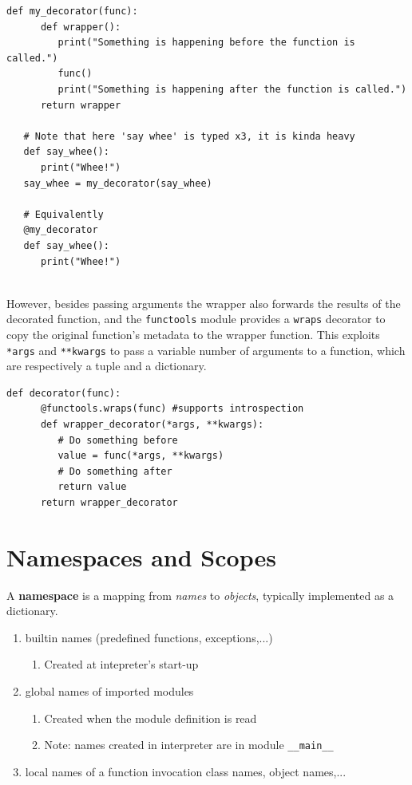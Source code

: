 \begin{lstlisting}[caption={``Pie'' syntax}]
   def my_decorator(func):
      def wrapper():
         print("Something is happening before the function is called.")
         func()
         print("Something is happening after the function is called.")
      return wrapper
   
   # Note that here 'say whee' is typed x3, it is kinda heavy
   def say_whee():
      print("Whee!")
   say_whee = my_decorator(say_whee)

   # Equivalently
   @my_decorator
   def say_whee():
      print("Whee!")
   
\end{lstlisting}

However, besides passing arguments the wrapper also forwards the results of the decorated function, and the \lstinline|functools| module provides a \lstinline|wraps| decorator to copy the original function's metadata to the wrapper function.
This exploits \lstinline|*args| and \lstinline|**kwargs| to pass a variable number of arguments to a function, which are respectively a tuple and a dictionary.

\begin{lstlisting}[caption={General decorator structure}]
   def decorator(func):
      @functools.wraps(func) #supports introspection
      def wrapper_decorator(*args, **kwargs):
         # Do something before
         value = func(*args, **kwargs)
         # Do something after
         return value
      return wrapper_decorator
\end{lstlisting}

\section{Namespaces and Scopes}
A \textbf{namespace} is a mapping from \textit{names} to \textit{objects}, typically
implemented as a dictionary.
\begin{enumerate}
   \item builtin names (predefined functions, exceptions,...)
   \begin{enumerate}
      \item Created at intepreter's start-up
   \end{enumerate}
   \item global names of imported modules
   \begin{enumerate}
      \item Created when the module definition is read
      \item Note: names created in interpreter are in module \lstinline|__main__|
   \end{enumerate}
   \item local names of a function invocation
   class names, object names,...
\end{enumerate}
\nl

